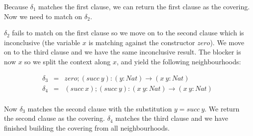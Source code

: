 Because $\delta_1$ matches the first clause, we can return the first clause as the covering. Now we need to match on $\delta_2$.

$\delta_2$ fails to match on the first clause so we move on to the second clause which is inconclusive (the variable $x$ is matching against the constructor $zero$). We move on to the third clause and we have the same inconclusive result. The blocker is now $x$ so we split the context along $x$, and yield the following neighbourhoods:

\begin{figure}[H]
  \begin{equation*}
    \begin{aligned}
      \delta_3 & = & zero; (succ \ y) : (y : Nat) \to (x \ y : Nat) \\
      \delta_4 & = & (succ \ x); (succ \ y) : (x \ y : Nat) \to (x \ y : Nat) \\
    \end{aligned}
  \end{equation*}
\end{figure}

Now $\delta_3$ matches the second clause with the substitution $y = succ \ y$. We return the second clause as the covering. $\delta_4$ matches the third clause and we have finished building the covering from all neighbourhoods.
